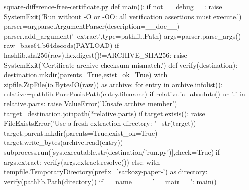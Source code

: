 \documentclass[11pt]{article}
\theoremstyle{definition}
\theoremstyle{remark}
\begin{document}
\begin{filecontents*}[overwrite]{square-difference-free-certificate.py}
def main():
    if not __debug__:
        raise SystemExit('Run without -O or -OO: all verification assertions must execute.')
    parser=argparse.ArgumentParser(description=__doc__)
    parser.add_argument('--extract',type=pathlib.Path)
    args=parser.parse_args()
    raw=base64.b64decode(PAYLOAD)
    if hashlib.sha256(raw).hexdigest()!=ARCHIVE_SHA256:
        raise SystemExit('Certificate archive checksum mismatch.')
    def verify(destination):
        destination.mkdir(parents=True,exist_ok=True)
        with zipfile.ZipFile(io.BytesIO(raw)) as archive:
            for entry in archive.infolist():
                relative=pathlib.PurePosixPath(entry.filename)
                if relative.is_absolute() or '..' in relative.parts:
                    raise ValueError('Unsafe archive member')
                target=destination.joinpath(*relative.parts)
                if target.exists():
                    raise FileExistsError('Use a fresh extraction directory: '+str(target))
                target.parent.mkdir(parents=True,exist_ok=True)
                target.write_bytes(archive.read(entry))
        subprocess.run([sys.executable,str(destination/'run.py')],check=True)
    if args.extract:
        verify(args.extract.resolve())
    else:
        with tempfile.TemporaryDirectory(prefix='sarkozy-paper-') as directory:
            verify(pathlib.Path(directory))
if __name__=='__main__':
    main()
\end{filecontents*}
\end{document}
